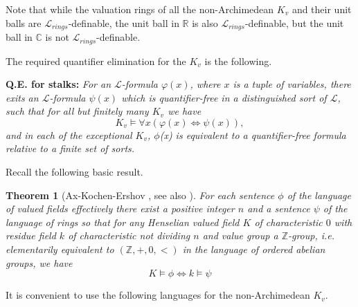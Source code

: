 \documentclass[12pt]{amsart}
\def\R{\mathbb{R}}
\def\C{\mathbb{C}}
\def\Z{\mathbb{Z}}
\def\cL{\mathcal{L}}
\def\C{\mathbb{C}}
\def\R{\mathbb{R}}
\def\cL{\mathcal{L}}
\newtheorem{thm}{Theorem}[section]
\numberwithin{equation}{section}
\begin{document}
Note that while the valuation rings of all the non-Archimedean $K_v$ and their unit balls are $\cL_{rings}$-definable, the unit ball in $\R$ is also $\cL_{rings}$-definable, but the unit ball in $\C$ is not $\cL_{rings}$-definable.

The required quantifier elimination for the $K_v$ is the following.

\medskip

{\bf Q.E. for stalks:} {\it For an $\cL$-formula $\varphi(x)$, where $x$ is a tuple of variables, 
there exits an $\cL$-formula $\psi(x)$ which is quantifier-free in a distinguished sort of $\cL$, such that for all but finitely many $K_v$ we have
$$K_v\models \forall x (\varphi(x) \Leftrightarrow \psi(x)),$$
and in each of the exceptional $K_v$, $\phi$(x) is equivalent to a quantifier-free formula relative to a finite set of sorts.}

\medskip

Recall the following basic result.

\begin{thm}[Ax-Kochen-Ershov {\cite{cherlin}, see also \cite{DM-ad}}]\label{ake} For each sentence $\phi$ of the language of valued fields effectively there exist a positive integer $n$ and a sentence $\psi$ of the language of rings so that for any Henselian valued field $K$ of characteristic $0$ with residue field $k$ of characteristic not dividing $n$ and value group a $\Z$-group, i.e. elementarily equivalent to $(\Z,+,0,<)$ in the language of ordered abelian groups, we have
$$K\models \phi \Leftrightarrow k \models\psi $$
\end{thm}

It is convenient to use the following languages for the non-Archimedean $K_v$.

\
\end{document}
